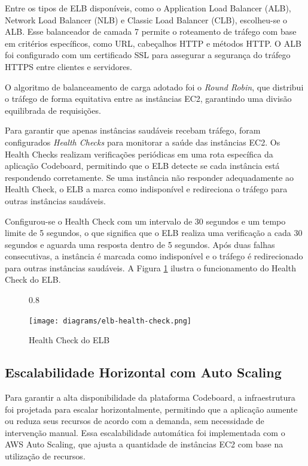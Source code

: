 Entre os tipos de ELB disponíveis, como o Application Load Balancer (ALB), Network Load Balancer (NLB) e Classic Load Balancer (CLB), escolheu-se o ALB. Esse balanceador de camada 7 permite o roteamento de tráfego com base em critérios específicos, como URL, cabeçalhos HTTP e métodos HTTP. O ALB foi configurado com um certificado SSL para assegurar a segurança do tráfego HTTPS entre clientes e servidores.

O algoritmo de balanceamento de carga adotado foi o \emph{Round Robin}, que distribui o tráfego de forma equitativa entre as instâncias EC2, garantindo uma divisão equilibrada de requisições.



Para garantir que apenas instâncias saudáveis recebam tráfego, foram configurados \emph{Health Checks} para monitorar a saúde das instâncias EC2. Os Health Checks realizam verificações periódicas em uma rota específica da aplicação Codeboard, permitindo que o ELB detecte se cada instância está respondendo corretamente. Se uma instância não responder adequadamente ao Health Check, o ELB a marca como indisponível e redireciona o tráfego para outras instâncias saudáveis.

Configurou-se o Health Check com um intervalo de 30 segundos e um tempo limite de 5 segundos, o que significa que o ELB realiza uma verificação a cada 30 segundos e aguarda uma resposta dentro de 5 segundos. Após duas falhas consecutivas, a instância é marcada como indisponível e o tráfego é redirecionado para outras instâncias saudáveis. A Figura \ref{fig:elb-health-check} ilustra o funcionamento do Health Check do ELB.

\begin{figure}[H]{0.8\textwidth}
    \centering
    \caption{Health Check do ELB}
    \label{fig:elb-health-check}
    \texttt{[image: diagrams/elb-health-check.png]}
\end{figure}


\subsection{Escalabilidade Horizontal com Auto Scaling}

Para garantir a alta disponibilidade da plataforma Codeboard, a infraestrutura foi projetada para escalar horizontalmente, permitindo que a aplicação aumente ou reduza seus recursos de acordo com a demanda, sem necessidade de intervenção manual. Essa escalabilidade automática foi implementada com o AWS Auto Scaling, que ajusta a quantidade de instâncias EC2 com base na utilização de recursos.

